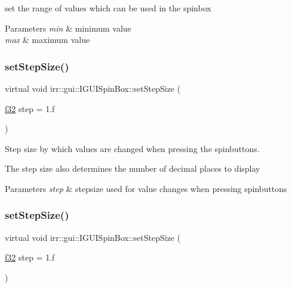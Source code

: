 set the range of values which can be used in the spinbox 


\begin{DoxyParams}{Parameters}
{\em min} & minimum value \\
\hline
{\em max} & maximum value \\
\hline
\end{DoxyParams}
\mbox{\label{classirr_1_1gui_1_1IGUISpinBox_a64296e93b52129fcf9068279baf0697d}} 
\subsubsection{\texorpdfstring{set\+Step\+Size()}{setStepSize()}\hspace{0.1cm}{\footnotesize\ttfamily [1/2]}}
{\footnotesize\ttfamily virtual void irr\+::gui\+::\+I\+G\+U\+I\+Spin\+Box\+::set\+Step\+Size (\begin{DoxyParamCaption}\item[{\hyperlink{namespaceirr_a0277be98d67dc26ff93b1a6a1d086b07}{f32}}]{step = {\ttfamily 1.f} }\end{DoxyParamCaption})\hspace{0.3cm}{\ttfamily [pure virtual]}}



Step size by which values are changed when pressing the spinbuttons. 

The step size also determines the number of decimal places to display 
\begin{DoxyParams}{Parameters}
{\em step} & stepsize used for value changes when pressing spinbuttons \\
\hline
\end{DoxyParams}
\mbox{\label{classirr_1_1gui_1_1IGUISpinBox_a64296e93b52129fcf9068279baf0697d}} 
\subsubsection{\texorpdfstring{set\+Step\+Size()}{setStepSize()}\hspace{0.1cm}{\footnotesize\ttfamily [2/2]}}
{\footnotesize\ttfamily virtual void irr\+::gui\+::\+I\+G\+U\+I\+Spin\+Box\+::set\+Step\+Size (\begin{DoxyParamCaption}\item[{\hyperlink{namespaceirr_a0277be98d67dc26ff93b1a6a1d086b07}{f32}}]{step = {\ttfamily 1.f} }\end{DoxyParamCaption})\hspace{0.3cm}{\ttfamily [pure virtual]}}




